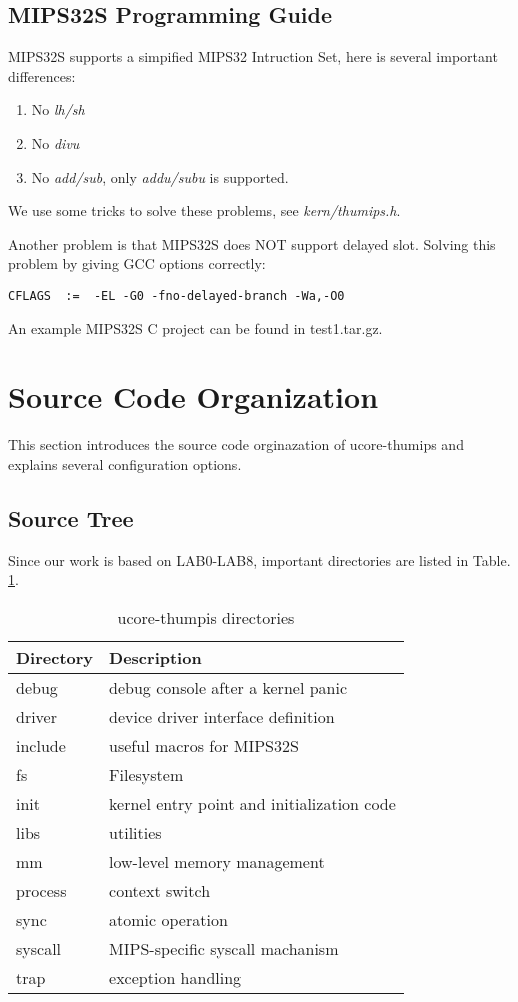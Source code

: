 \documentclass[a4paper]{article}
\begin{document}
\subsection{MIPS32S Programming Guide}
MIPS32S supports a simpified MIPS32 Intruction Set, here is several important differences:

\begin{enumerate}
\item No \emph{lh/sh}
\item No \emph{divu}
\item No \emph{add/sub}, only \emph{addu/subu} is supported.
\end{enumerate}

We use some tricks to solve these problems, see \emph{kern/thumips.h}.

Another problem is that MIPS32S does NOT support delayed slot. Solving 
this problem by giving GCC options correctly:

\begin{verbatim}
CFLAGS	:=  -EL -G0 -fno-delayed-branch -Wa,-O0
\end{verbatim}

An example MIPS32S C project can be found in test1.tar.gz.


\section{Source Code Organization}
This section introduces the source code orginazation of ucore-thumips
and explains several configuration options.
\subsection{Source Tree}
Since our work is based on LAB0-LAB8, important directories are listed in Table. \ref{tab:dir}.

\begin{table}[h]
  \centering
  \begin{tabular}{|l|l|}
    \hline
    Directory & Description \\
    \hline
    debug  &     debug console after a kernel panic \\
    driver &     device driver interface definition \\
    include &    useful macros for MIPS32S \\
    fs     &     Filesystem \\
    init   &     kernel entry point and initialization code \\
    libs   &     utilities \\
    mm     &     low-level memory management \\
    process   &  context switch             \\
    sync   &     atomic operation           \\
    syscall &     MIPS-specific syscall machanism \\
    trap   &     exception handling  \\
    \hline
  \end{tabular}
  \caption{ucore-thumpis directories}
  \label{tab:dir}
\end{table}
\end{document}

